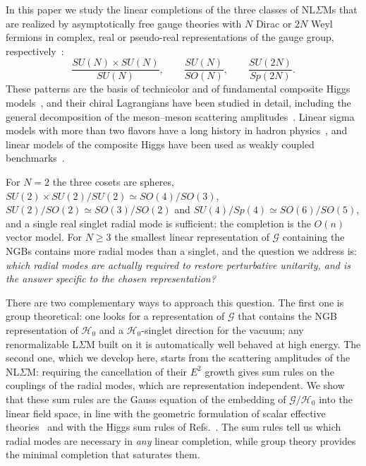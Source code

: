 \documentclass[aps,prd,twocolumn,superscriptaddress,nofootinbib,floatfix]{revtex4-2}
\theoremstyle{remark}
\newcommand{\G}{\mathcal{G}}
\newcommand{\Hg}{\mathcal{H}_0}    %
\begin{document}
In this paper we study the linear completions of the three classes of NL$\Sigma$Ms that are realized by asymptotically free gauge theories with $N$ Dirac or $2N$ Weyl fermions in complex, real or pseudo-real representations of the gauge group, respectively~\cite{Peskin:1980gc,Preskill:1980mz,Dimopoulos:1980hn,Dimopoulos:1981xc,Kogut:2000ek}:
\begin{equation}
\frac{SU(N)\times SU(N)}{SU(N)},\qquad \frac{SU(N)}{SO(N)},\qquad \frac{SU(2N)}{Sp(2N)} .
\label{eq:cosets}
\end{equation}
These patterns are the basis of technicolor and of fundamental composite Higgs models~\cite{Kaplan:1983fs,Agashe:2004rs,Contino:2010rs,Panico:2015jxa,Bellazzini:2014yua,Galloway:2010bp,Barnard:2013zea,Ferretti:2013kya,Ferretti:2014qta,Cacciapaglia:2014uja,Cacciapaglia:2020kgq}, and their chiral Lagrangians have been studied in detail, including the general decomposition of the meson--meson scattering amplitudes~\cite{Gasser:1983yg,Gasser:1984gg,Chivukula:1992gi,Splittorff:2001fy,Splittorff:2002xn,Bijnens:2009qm,Bijnens:2011fm}. Linear sigma models with more than two flavors have a long history in hadron physics~\cite{Schechter:1971qa,Pisarski:1983ms,Lenaghan:2000ey,Fariborz:2005gm,Parganlija:2012fy}, and linear models of the composite Higgs have been used as weakly coupled benchmarks~\cite{Barbieri:2007bh,Alanne:2014kea,Gertov:2015xma}.

For $N=2$ the three cosets are spheres, $SU(2)\times SU(2)/SU(2)\simeq SO(4)/SO(3)$, $SU(2)/SO(2)\simeq SO(3)/SO(2)$ and $SU(4)/Sp(4)\simeq SO(6)/SO(5)$, and a single real singlet radial mode is sufficient: the completion is the $O(n)$ vector model. For $N\geq 3$ the smallest linear representation of $\G$ containing the NGBs contains more radial modes than a singlet, and the question we address is: \emph{which radial modes are actually required to restore perturbative unitarity, and is the answer specific to the chosen representation?}

There are two complementary ways to approach this question. The first one is group theoretical: one looks for a representation of $\G$ that contains the NGB representation of $\Hg$ and a $\Hg$-singlet direction for the vacuum; any renormalizable L$\Sigma$M built on it is automatically well behaved at high energy. The second one, which we develop here, starts from the scattering amplitudes of the NL$\Sigma$M: requiring the cancellation of their $E^2$ growth gives sum rules on the couplings of the radial modes, which are representation independent. We show that these sum rules are the Gauss equation of the embedding of $\G/\Hg$ into the linear field space, in line with the geometric formulation of scalar effective theories~\cite{Alonso:2015fsp,Alonso:2016oah,Nagai:2019tgi,Falkowski:2019tft,Cohen:2020xca,Cohen:2021ucp} and with the Higgs sum rules of Refs.~\cite{Gunion:1990kf,Falkowski:2012vh}. The sum rules tell us which radial modes are necessary in \emph{any} linear completion, while group theory provides the minimal completion that saturates them.
\end{document}
